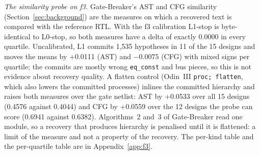 \documentclass[conference]{IEEEtran}
\newcommand{\code}[1]{\texttt{#1}}
\begin{document}
\emph{The similarity probe on f3.} Gate-Breaker's AST and CFG similarity (Section~\ref{sec:background})
are the measures on which a recovered text is compared with the reference RTL. With the f3 calibration
L1-stop is byte-identical to L0-stop, so both measures have a delta of exactly 0.0000 in every quartile.
Uncalibrated, L1 commits 1,535 hypotheses in 11 of the 15 designs and moves the means by +0.0111 (AST) and
$-0.0075$ (CFG) with mixed signs per quartile; the commits are mostly wrong \code{eq\_const} and bus pieces,
so this is not evidence about recovery quality. A flatten control (Odin~III \code{proc; flatten}, which also
lowers the committed processes) inlines the committed hierarchy and raises both measures over the gate
netlist: AST by +0.0533 over all 15 designs (0.4576 against 0.4044) and CFG by +0.0559 over the 12 designs the
probe can score (0.6941 against 0.6382). Algorithms~2 and~3 of Gate-Breaker read one module, so a recovery
that produces hierarchy is penalised until it is flattened: a limit of the measure and not a property of the
recovery. The per-kind table and the per-quartile table are in Appendix~\ref{app:f3}.


\end{document}
